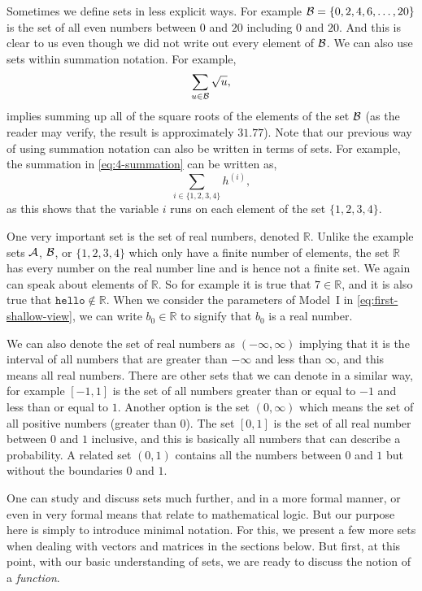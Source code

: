 \documentclass[12pt]{article}
\begin{document}
Sometimes we define sets in less explicit ways. For example ${\cal B} = \{0,2,4,6,\ldots,20\}$ is the set of all even numbers between $0$ and $20$ including $0$ and $20$. And this is clear to us even though we did not write out every element of ${\cal B}$. We can also use sets within summation notation. For example, 
%
\begin{equation}
\sum_{u \in {\cal B}} \sqrt{u},
\end{equation}
%
implies summing up all of the square roots of the elements of the set ${\cal B}$ (as the reader may verify, the result is approximately $31.77$). Note  that our previous way of using summation notation can also be written in terms of sets. For example, the summation in \eqref{eq:4-summation} can be written as,
%
\begin{equation}
\sum_{i \in \{1,2,3,4\}} h^{(i)},
\end{equation}
%
as this shows that the variable $i$ runs on each element of the set $\{1,2,3,4\}$. 

One very important set is the set of real numbers, denoted ${\mathbb R}$. Unlike the example sets ${\cal A}$, ${\cal B}$, or $\{1,2,3,4\}$ which only have a finite number of elements, the set ${\mathbb R}$ has every number on the real number line and is hence not a finite set. We again can speak about elements of ${\mathbb R}$. So for example it is true that $7 \in {\mathbb R}$,  and it is also true that $\texttt{hello} \not\in {\mathbb R}$. When we consider the parameters of Model~I in \eqref{eq:first-shallow-view}, we can write $b_0 \in {\mathbb R}$ to signify that $b_0$ is a real number.

We can also denote the set of real numbers as $(-\infty, \infty)$ implying that it is the interval of all numbers that are greater than $-\infty$ and less than $\infty$, and this means all real numbers. There are other sets that we can denote in a similar way, for example $[-1,1]$ is the set of all numbers greater than or equal to $-1$ and less than or equal to $1$. Another option is the set $(0,\infty)$ which means the set of all positive numbers (greater than $0$). The set $[0,1]$ is the set of all real number between $0$ and $1$ inclusive, and this is basically all numbers that can describe a probability. A related set $(0,1)$ contains all the numbers between $0$ and $1$ but without the boundaries $0$ and $1$.

One can study and discuss sets much further, and in a more formal manner, or even in very formal means that relate to mathematical logic. But our purpose here is simply to introduce minimal notation. For this, we present a few more sets when dealing with vectors and matrices in the sections below. But first, at this point, with our basic understanding of sets, we are ready to discuss the notion of a {\em function}. 
\end{document}
